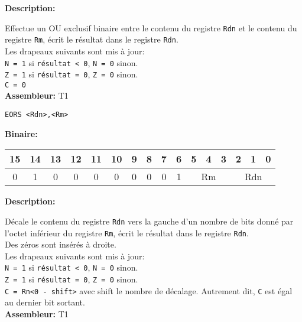 \documentclass{article}
\begin{document}
    \textbf{Description: }

    Effectue un OU exclusif binaire entre le contenu du registre \texttt{Rdn} et le contenu du registre \texttt{Rm}, écrit le résultat dans le registre \texttt{Rdn}.\\
    Les drapeaux suivants sont mis à jour:\\
    \texttt{N = 1} si \texttt{résultat < 0}, \texttt{N = 0} sinon.\\
    \texttt{Z = 1} si \texttt{résultat = 0}, \texttt{Z = 0} sinon.\\
    \texttt{C = 0}\\

    \textbf{Assembleur:} T1

    \begin{lstlisting}
EORS <Rdn>,<Rm>
    \end{lstlisting}

    \textbf{Binaire:}

    \begin{tabular}{| c c c c c c c c c c c c c c c c |}
        \hline
        15 & 14 & 13 & 12 & 11 & 10 & \multicolumn{1}{|c}{9} & 8 & 7 & 6 & \multicolumn{1}{|c}{5} & 4 & 3 & \multicolumn{1}{|c}{2} & 1 & 0 \\
        \hline
        0 & 1 & 0 & 0 & 0 & 0 & \multicolumn{1}{|c}{0} & 0 & 0 & 1 & \multicolumn{3}{|c}{Rm} & \multicolumn{3}{|c|}{Rdn} \\
        \hline
    \end{tabular}



    \textbf{Description: }

    Décale le contenu du registre \texttt{Rdn} vers la gauche d'un nombre de bits donné par l'octet inférieur du registre \texttt{Rm}, écrit le résultat dans le registre \texttt{Rdn}.\\
    Des zéros sont insérés à droite.\\
    Les drapeaux suivants sont mis à jour:\\
    \texttt{N = 1} si \texttt{résultat < 0}, \texttt{N = 0} sinon.\\
    \texttt{Z = 1} si \texttt{résultat = 0}, \texttt{Z = 0} sinon.\\
    \texttt{C = Rn<0 - shift>} avec shift le nombre de décalage.
    Autrement dit, \texttt{C} est égal au dernier bit sortant.\\

    \textbf{Assembleur:} T1
\end{document}
